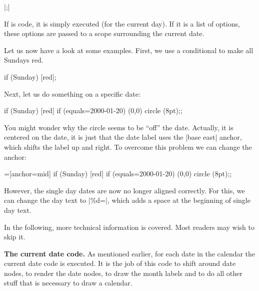 \begin{command}{\calendar {}|;|}
\begin{enumerate}
    If  is code, it is simply executed (for the
    current day). If it is a list of options, these options are passed
    to a scope surrounding the current date.
  \end{enumerate}
  Let us now have a look at some examples. First, we use a conditional
  to make all Sundays red.
\begin{codeexample}[]
\tikz
  \calendar
    [dates=2000-01-01 to 2000-01-31,week list]
    if (Sunday) [red];
\end{codeexample}
  Next, let us do something on a specific date:
\begin{codeexample}[]
\tikz
  \calendar
    [dates=2000-01-01 to 2000-01-31,week list]
    if (Sunday)            [red]
    if (equals=2000-01-20) {\draw (0,0) circle (8pt);};
\end{codeexample}
  You might wonder why the circle seems to be ``off'' the
  date. Actually, it is centered on the date, it is just that the date
  label uses the |base east| anchor, which shifts the label up and
  right. To overcome this problem we can change the anchor:
\begin{codeexample}[]
=[anchor=mid]
\tikz
  \calendar
    [dates=2000-01-01 to 2000-01-31,week list]
    if (Sunday)            [red]
    if (equals=2000-01-20) {\draw (0,0) circle (8pt);};
\end{codeexample}
  However, the single day dates are now no longer aligned
  correctly. For this, we can change the day text to |\%d=|,
  which adds a space at the beginning of single day
  text.
  
  In the following, more technical information is covered. Most
  readers may wish to skip it.

  \medskip
  \textbf{The current date code.}
  As mentioned earlier, for each date in the calendar the current date
  code is executed. It is the job of this code to shift around date
  nodes, to render the date nodes, to draw the month labels and to do
  all other stuff that is necessary to draw a calendar.


\end{command}
